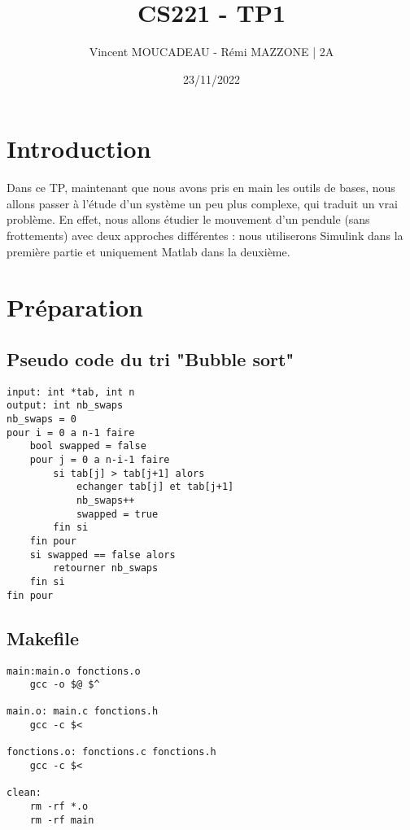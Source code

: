 \documentclass[12pt]{article}
\title{CS221 - TP1}
\author{Vincent MOUCADEAU - Rémi MAZZONE | 2A}
\date{23/11/2022}
\begin{document}
\maketitle

\tableofcontents
\newpage

\section{Introduction}
Dans ce TP, maintenant que nous avons pris en main les outils de bases, nous allons passer à l'étude d'un système un peu plus complexe, qui traduit un vrai problème. En effet, nous allons étudier le mouvement d'un pendule (sans frottements) avec deux approches différentes : nous utiliserons Simulink dans la première partie et uniquement Matlab dans la deuxième.

\section{Préparation} 
\subsection{Pseudo code du tri "Bubble sort"} 

\begin{lstlisting}[style=pseudoCode, caption=Pseudo code du tri "Bubble sort" optimisé]
input: int *tab, int n
output: int nb_swaps
nb_swaps = 0
pour i = 0 a n-1 faire
    bool swapped = false
    pour j = 0 a n-i-1 faire
        si tab[j] > tab[j+1] alors
            echanger tab[j] et tab[j+1]
            nb_swaps++
            swapped = true
        fin si
    fin pour
    si swapped == false alors
        retourner nb_swaps
    fin si
fin pour
\end{lstlisting} 

\subsection{Makefile} 
\begin{lstlisting}[style=Makefile, caption=Makefile du projet]
main:main.o fonctions.o 
    gcc -o $@ $^

main.o: main.c fonctions.h 
    gcc -c $<

fonctions.o: fonctions.c fonctions.h 
    gcc -c $<

clean: 
    rm -rf *.o 
    rm -rf main
\end{lstlisting} 
\end{document}
